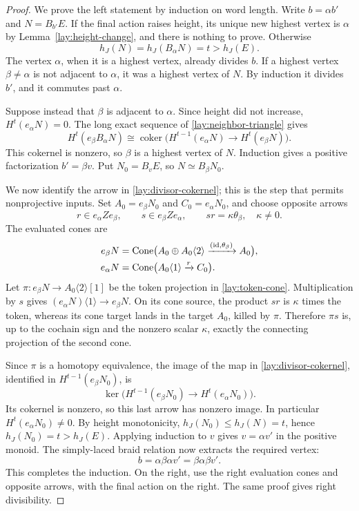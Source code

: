 \begin{proof}
We prove the left statement by induction on word length.  Write
$b=\alpha b'$ and $N=B_{b'}E$.  If the final action raises height,
its unique new highest vertex is $\alpha$ by
Lemma~\ref{lay:height-change}, and there is nothing to prove.
Otherwise
\[
 h_J(N)=h_J(B_\alpha N)=t>h_J(E).
\]
The vertex $\alpha$, when it is a highest vertex, already divides
$b$.  If a highest vertex $\beta\ne\alpha$ is not adjacent to
$\alpha$, it was a highest vertex of $N$.  By induction it divides
$b'$, and it commutes past $\alpha$.

Suppose instead that $\beta$ is adjacent to $\alpha$.  Since height
did not increase, $H^t(e_\alpha N)=0$.  The long exact sequence of
\eqref{lay:neighbor-triangle} gives
\begin{equation}
 H^t(e_\beta B_\alpha N)
 \cong\operatorname{coker}\bigl(
 H^{t-1}(e_\alpha N)\longrightarrow H^t(e_\beta N)\bigr).
 \label{lay:divisor-cokernel}
\end{equation}
This cokernel is nonzero, so $\beta$ is a highest vertex of $N$.
Induction gives a positive factorization $b'=\beta v$.  Put
$N_0=B_vE$, so $N\simeq B_\beta N_0$.

We now identify the arrow in \eqref{lay:divisor-cokernel}; this is the
step that permits nonprojective inputs.  Set
$A_0=e_\beta N_0$ and $C_0=e_\alpha N_0$, and choose opposite arrows
\[
 r\in e_\alpha Ze_\beta,\qquad
 s\in e_\beta Ze_\alpha,\qquad
 sr=\kappa\theta_\beta,\quad\kappa\ne0.
\]
The evaluated cones are
\[
\begin{split}
 e_\beta N&=\operatorname{Cone}\bigl(A_0\oplus A_0\langle2\rangle
                   \xrightarrow{(\mathrm{id},\theta_\beta)}A_0\bigr),\\
 e_\alpha N&=\operatorname{Cone}\bigl(A_0\langle1\rangle
                   \xrightarrow{r}C_0\bigr).
\end{split}
\]
Let $\pi:e_\beta N\to A_0\langle2\rangle[1]$ be the token
projection in \eqref{lay:token-cone}.  Multiplication by $s$ gives
$(e_\alpha N)\langle1\rangle\to e_\beta N$.  On its cone source,
the product $sr$ is $\kappa$ times the token, whereas its cone target
lands in the target $A_0$, killed by $\pi$.  Therefore $\pi s$ is,
up to the cochain sign and the nonzero scalar $\kappa$, exactly the
connecting projection of the second cone.

Since $\pi$ is a homotopy equivalence, the image of the map in
\eqref{lay:divisor-cokernel}, identified in
$H^{t-1}(e_\beta N_0)$, is
\[
 \ker\bigl(H^{t-1}(e_\beta N_0)
                 \longrightarrow H^t(e_\alpha N_0)\bigr).
\]
Its cokernel is nonzero, so this last arrow has nonzero image.
In particular $H^t(e_\alpha N_0)\ne0$.  By height monotonicity,
$h_J(N_0)\le h_J(N)=t$, hence
$h_J(N_0)=t>h_J(E)$.  Applying induction to $v$ gives
$v=\alpha v'$ in the positive monoid.  The simply-laced braid relation
now extracts the required vertex:
\[
 b=\alpha\beta\alpha v'=\beta\alpha\beta v'.
\]
This completes the induction.  On the right, use the right evaluation
cones and opposite arrows, with the final action on the right.  The
same proof gives right divisibility.
\end{proof}

